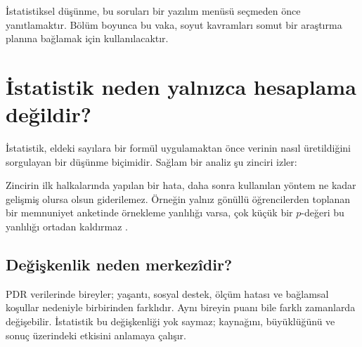 İstatistiksel düşünme, bu soruları bir yazılım menüsü seçmeden önce
yanıtlamaktır. Bölüm boyunca bu vaka, soyut kavramları somut bir araştırma
planına bağlamak için kullanılacaktır.

\section{İstatistik neden yalnızca hesaplama değildir?}

İstatistik, eldeki sayılara bir formül uygulamaktan önce verinin nasıl
üretildiğini sorgulayan bir düşünme biçimidir. Sağlam bir analiz şu zinciri
izler:
\begin{center}
\end{center}
Zincirin ilk halkalarında yapılan bir hata, daha sonra kullanılan yöntem ne
kadar gelişmiş olursa olsun giderilemez. Örneğin yalnız gönüllü öğrencilerden
toplanan bir memnuniyet anketinde örnekleme yanlılığı varsa, çok küçük bir
$p$-değeri bu yanlılığı ortadan kaldırmaz \cite{longford2008,lohr2021}.

\subsection{Değişkenlik neden merkezîdir?}

PDR verilerinde bireyler; yaşantı, sosyal destek, ölçüm hatası ve bağlamsal
koşullar nedeniyle birbirinden farklıdır. Aynı bireyin puanı bile farklı
zamanlarda değişebilir. İstatistik bu değişkenliği yok saymaz; kaynağını,
büyüklüğünü ve sonuç üzerindeki etkisini anlamaya çalışır.

